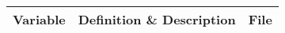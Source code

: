 
\begin{longtable}{>{\ttfamily}l X >{\ttfamily}l}
	\rowcolor{gray!50}
	\textbf{Variable} & \textbf{Definition \& Description} & \textbf{File} \\
	
			
		
	\bottomrule
\end{longtable}
